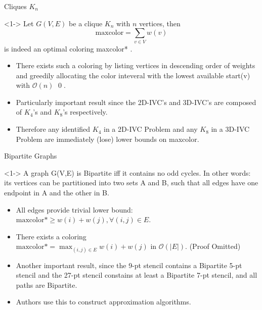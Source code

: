\begin{frame}{Cliques $K_n$}
  \begin{theorem}<1->
    Let $G(V,E)$ be a clique $K_n$ with $n$ vertices, then  \[ \text{maxcolor}= \sum_{v \in V} w(v) \]
    is indeed an optimal coloring maxcolor* .
  \end{theorem}

  \begin{itemize}
    \item<2-> There exists such a coloring by listing vertices in descending order of weights and
    greedily allocating the color inteveral with the lowest available start(v) with $\mathcal{O}(n)$ \qed .

    \item<3-> Particularly important result since the 2D-IVC's and 3D-IVC's are composed of $K_4$'s and $K_8$'s
    respectively.

    \item<4-> Therefore any identified $K_4$ in a 2D-IVC Problem and any $K_8$ in a 3D-IVC Problem are immediately
    (lose) lower bounds on maxcolor.
  \end{itemize}
\end{frame}

\begin{frame}{Bipartite Graphs}
  \begin{Theorem}<1->
    A graph G(V,E) is Bipartite iff it contains no odd cycles. In other words: its vertices can be partitioned into
    two sets A and B, such that all edges have one endpoint in A and the other in B.
  \end{Theorem}

  \begin{itemize}
    \item<2-> All edges provide trivial lower bound: $ \text{maxcolor*} \ge  w(i) + w(j), \forall (i, j) \in E.$
    \item<3-> There exists a coloring \\ 
    $\text{maxcolor*} = \max_{(i,j) \in E} w(i) + w(j)$ in $\mathcal{O}(|E|)$. (Proof Omitted)
    \item<4-> Another important result, since the 9-pt stencil contains a Bipartite 5-pt stencil and the
    27-pt stencil constains at least a Bipartite 7-pt stencil, and all paths are Bipartite.
    \item<5-> Authors use this to construct approximation algorithms.
  \end{itemize}
\end{frame}

